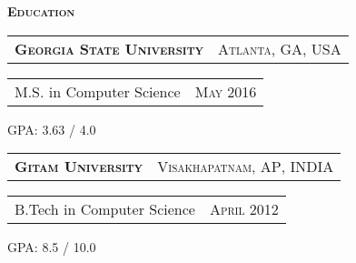 \documentclass[10pt,a4paper,oneside]{article}
\begin{document}
\begin{minipage}[t]{0.4\textwidth}
        \textcolor{light-gray}{\textbf{\large E\textsc{ducation}}}
        \vspace{10pt}\\
        \begin{tabular}{c|c}
            \textbf{\normalsize G\textsc{eorgia} S\textsc{tate} U\textsc{niversity}}
            & \textcolor{light-gray}{
            	 {\small A\textsc{tlanta}, G\textsc{A}, U\textsc{SA}}
        }\\
        \end{tabular}
        \begin{tabular}{c|c}            
            {\small M.S. in Computer Science }&
            {\small M\textsc{ay} 2016}\\
        \end{tabular}
         \begin{adjustwidth}{7pt}{0pt}
            {\small GPA: 3.63 / 4.0}
            \end{adjustwidth}  
         \vspace{10pt}
        \begin{tabular}{c|c}
            \textbf{\normalsize G\textsc{itam} U\textsc{niversity}}
            & \textcolor{light-gray}{
            	 {\small V\textsc{isakhapatnam}, A\textsc{P}, I\textsc{NDIA}}
        	    }\\
	   \end{tabular}
           \begin{tabular}{c|c}
            {\small B.Tech in Computer Science }&
            {\small A\textsc{pril} 2012}
            \end{tabular}
            \begin{adjustwidth}{7pt}{0pt}
            {\small GPA: 8.5 / 10.0}
            \end{adjustwidth}  


\end{minipage}
\end{document}
